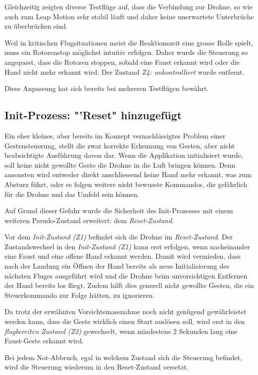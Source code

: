 Gleichzeitig zeigten diverse Testflüge auf, dass die Verbindung zur Drohne, so wie auch zum Leap Motion sehr stabil läuft und daher keine unerwartete Unterbrüche zu überbrücken sind.

Weil in kritischen Flugsituationen meist die Reaktionszeit eine grosse Rolle spielt, muss ein Rotorenstop möglichst intuitiv erfolgen.
Daher wurde die Steuerung so angepasst, dass die Rotoren stoppen, sobald eine Faust erkannt wird oder die Hand nicht mehr erkannt wird.
Der Zustand \textit{Z4: unkontrolliert} wurde entfernt.

Diese Anpassung hat sich bereits bei mehreren Testflügen bewährt.

\subsection{Init-Prozess: "'Reset" hinzugefügt}
Ein eher kleines, aber bereits im Konzept vernachlässigtes Problem einer Gestensteuerung, stellt die zwar korrekte Erkennung von Gesten, aber nicht beabsichtigte Ausführung davon dar.
Wenn die Applikation initialisiert wurde, soll keine nicht gewollte  Geste die Drohne in die Luft bringen können.
Denn ansonsten wird entweder direkt anschliessend keine Hand mehr erkannt, was zum Absturz führt, oder es folgen weitere nicht bewusste Kommandos, die gefährlich für die Drohne und das Umfeld sein können.

Auf Grund dieser Gefahr wurde die Sicherheit des Init-Prozesses mit einem weiteren Pseudo-Zustand erweitert: dem \textit{Reset-Zustand}.

Vor dem \textit{Init-Zustand (Z1)} befindet sich die Drohne im \textit{Reset-Zustand}. Der Zustandswechsel in den \textit{Init-Zustand (Z1)} kann erst erfolgen, wenn nacheinander eine Faust und eine offene Hand erkannt werden.
Damit wird vermieden, dass nach der Landung ein Öffnen der Hand bereits als neue Initialisierung des nächsten Fluges ausgeführt wird und die Drohne beim unvorsichtigen Entfernen der Hand bereits los fliegt.
Zudem hilft dies generell nicht gewollte Gesten, die ein Steuerkommando zur Folge hätten, zu ignorieren.

Da trotz der erwähnten Vorsichtsmassnahme noch nicht genügend gewährleistet werden kann, dass die Geste wirklich einen Start auslösen soll, wird erst in den \textit{flugbereiten Zustand (Z2)} gewechselt, wenn mindestens 2 Sekunden lang eine Faust-Geste erkannt wird.

Bei jedem Not-Abbruch, egal in welchem Zustand sich die Steuerung befindet, wird die Steuerung wiederum in den Reset-Zustand versetzt.

